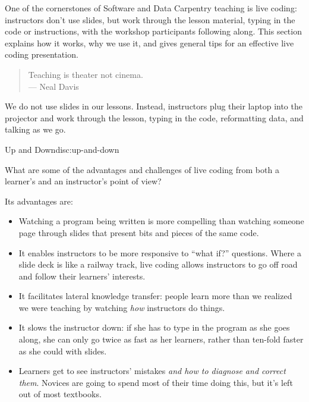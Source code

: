 
One of the cornerstones of Software and Data Carpentry teaching is live
coding: instructors don't use slides, but work through the lesson
material, typing in the code or instructions, with the workshop
participants following along. This section explains how it works, why we
use it, and gives general tips for an effective live coding
presentation.


\begin{quote}
Teaching is theater not cinema.\\--- Neal Davis
\end{quote}

We do not use slides in our lessons. Instead, instructors plug their
laptop into the projector and work through the lesson, typing in the
code, reformatting data, and talking as we go.

\begin{discussion}{Up and Down}{disc:up-and-down}

What are some of the advantages and challenges of live coding from both
a learner's and an instructor's point of view?
\end{discussion}

Its advantages are:

\begin{itemize}
\item
  Watching a program being written is more compelling than watching
  someone page through slides that present bits and pieces of the same
  code.
\item
  It enables instructors to be more responsive to ``what if?''
  questions. Where a slide deck is like a railway track, live coding
  allows instructors to go off road and follow their learners'
  interests.
\item
  It facilitates lateral knowledge transfer: people learn more than we
  realized we were teaching by watching \emph{how} instructors do
  things.
\item
  It slows the instructor down: if she has to type in the program as she
  goes along, she can only go twice as fast as her learners, rather than
  ten-fold faster as she could with slides.
\item
  Learners get to see instructors' mistakes \emph{and how to diagnose
  and correct them}. Novices are going to spend most of their time doing
  this, but it's left out of most textbooks.
\end{itemize}

